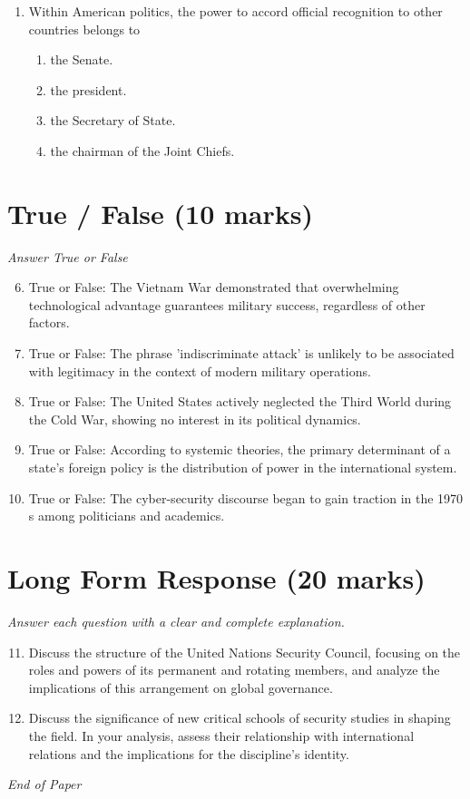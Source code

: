 \documentclass[12pt]{article}
\begin{document}
\begin{enumerate}[label=\arabic*.]
\begin{enumerate}[label=(\alph*)]
    \item Abraham Lincoln
    \item Woodrow Wilson
    \item Thomas Jefferson
\end{enumerate}
\item Within American politics, the power to accord official recognition to other countries belongs to
\begin{enumerate}[label=(\alph*)]
    \item the Senate.
    \item the president.
    \item the Secretary of State.
    \item the chairman of the Joint Chiefs.
\end{enumerate}
\end{enumerate}

\section*{True / False (10 marks)}
\textit{Answer True or False}
\begin{enumerate}[label=\arabic*.]
\setcounter{enumi}{5}
\item True or False: The Vietnam War demonstrated that overwhelming technological advantage guarantees military success, regardless of other factors.
\item True or False: The phrase 'indiscriminate attack' is unlikely to be associated with legitimacy in the context of modern military operations.
\item True or False: The United States actively neglected the Third World during the Cold War, showing no interest in its political dynamics.
\item True or False: According to systemic theories, the primary determinant of a state's foreign policy is the distribution of power in the international system.
\item True or False: The cyber-security discourse began to gain traction in the 1970 s among politicians and academics.
\end{enumerate}

\section*{Long Form Response (20 marks)}
\textit{Answer each question with a clear and complete explanation.}
\begin{enumerate}[label=\arabic*.]
\setcounter{enumi}{10}
\item Discuss the structure of the United Nations Security Council, focusing on the roles and powers of its permanent and rotating members, and analyze the implications of this arrangement on global governance.
\item Discuss the significance of new critical schools of security studies in shaping the field. In your analysis, assess their relationship with international relations and the implications for the discipline's identity.
\end{enumerate}

\vfill
\noindent\textit{End of Paper}
\end{document}

